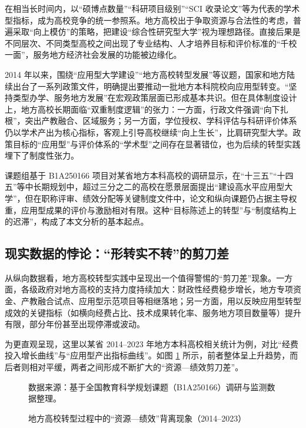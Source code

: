 \documentclass[UTF8, zihao=-4, fontset=mac]{ctexart}
\begin{document}
在相当长时间内，以“硕博点数量”“科研项目级别”“SCI 收录论文”等为代表的学术型指标，成为高校竞争的统一参照系。地方高校出于争取资源与合法性的考虑，普遍采取“向上模仿”的策略，把建设“综合性研究型大学”视为理想路径\cite{pan2014transformation, mok2005globalization}。直接后果是不同层次、不同类型高校之间出现了专业结构、人才培养目标和评价标准的“千校一面”，服务地方经济社会发展的功能被边缘化\cite{zha2011understanding}。

2014 年以来，围绕“应用型大学建设”“地方高校转型发展”等议题，国家和地方陆续出台了一系列政策文件，明确提出要推动一批地方本科院校向应用型转变\cite{pan2014transformation, zhong2014applied}。“坚持类型办学、服务地方发展”在宏观政策层面已形成基本共识。但在具体制度设计上，地方高校长期面临“双重制度逻辑”的张力：一方面，行政文件强调“向下扎根”，突出产教融合、区域服务；另一方面，学位授权、学科评估与科研评价体系仍以学术产出为核心指标，客观上引导高校继续“向上生长”，比肩研究型大学。政策目标的“应用型”与评价体系的“学术型”之间存在显著错位，也为后续的转型实践埋下了制度性张力。

课题组基于 B1A250166 项目对某省地方本科高校的调研显示，在“十三五”“十四五”等中长期规划中，超过三分之二的高校在愿景层面提出“建设高水平应用型大学”，但在职称评审、绩效分配等关键制度文件中，论文和纵向课题仍占据主导权重，应用型成果的评价与激励相对有限。这种“目标陈述上的转型”与“制度结构上的迟滞”，构成了本文分析的基本起点。

\subsection{现实数据的悖论：“形转实不转”的剪刀差}

从纵向数据看，地方高校转型实践中呈现出一个值得警惕的“剪刀差”现象。一方面，各级政府对地方高校的支持力度持续加大：财政性经费稳步增长，地方专项资金、产教融合试点、应用型示范项目等相继落地；另一方面，用以反映应用型转型成效的关键指标（如横向经费占比、技术成果转化率、服务地方项目数量等）提升有限，部分年份甚至出现停滞或波动。

为更直观呈现，这里以某省 2014--2023 年地方本科高校相关统计为例，对比“经费投入增长曲线”与“应用型产出指标曲线”。如图 \ref{fig:paradox} 所示，前者整体呈上升趋势，而后者则相对平缓，两者之间形成不断扩大的“资源—绩效剪刀差”。

\begin{figure}[htbp]
    \centering
    \caption{地方高校转型过程中的“资源—绩效”背离现象（2014--2023）}
    \label{fig:paradox}
    \vspace{-0.5em}
    {\footnotesize \kaishu 数据来源：基于全国教育科学规划课题（B1A250166）调研与监测数据整理。}
\end{figure}
\end{document}
